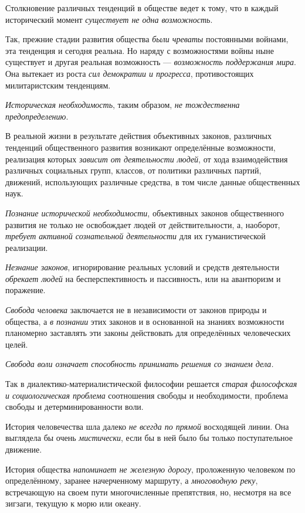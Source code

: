 \documentclass[a4paper,14pt,russian]{extreport}
\begin{document}
Столкновение различных тенденций в обществе ведет к тому, что в каждый исторический момент \emph{существует не одна возможность}.

Так, прежние стадии развития общества \emph{были чреваты} постоянными войнами, эта тенденция и сегодня реальна. Но наряду с возможностями войны ныне существует и другая реальная возможность --- \emph{возможность поддержания мира}. Она вытекает из роста \emph{сил демократии и прогресса}, противостоящих милитаристским тенденциям.

\emph{Историческая необходимость}, таким образом, \emph{не тождественна предопределению}.

В реальной жизни в результате действия объективных законов, различных тенденций общественного развития возникают определённые возможности, реализация которых \emph{зависит от деятельности людей}, от хода взаимодействия различных социальных групп, классов, от политики различных партий, движений, использующих различные средства, в том числе данные общественных наук.

\emph{Познание исторической необходимости}, объективных законов общественного развития не только не освобождает людей от действительности, а, наоборот, \emph{требует активной сознательной деятельности} для их гуманистической реализации.

\emph{Незнание законов}, игнорирование реальных условий и средств деятельности \emph{обрекает людей} на бесперспективность и пассивность, или на авантюризм и поражение.

\emph{Свобода человека} заключается не в независимости от законов природы и общества, а \emph{в познании} этих законов и в основанной на знаниях возможности планомерно заставлять эти законы действовать для определённых человеческих целей.

\emph{Свобода воли означает способность принимать решения со знанием дела.}

Так в диалектико-материалистической философии решается \emph{старая философская и социологическая проблема} соотношения свободы и необходимости, проблема свободы и детерминированности воли.

История человечества шла далеко \emph{не всегда по прямой} восходящей линии. Она выглядела бы очень \emph{мистически}, если бы в ней было бы только поступательное движение.

История общества \emph{напоминает не железную дорогу}, проложенную человеком по определённому, заранее начерченному маршруту, а \emph{многоводную реку}, встречающую на своем пути многочисленные препятствия, но, несмотря на все зигзаги, текущую к морю или океану.
\end{document}
